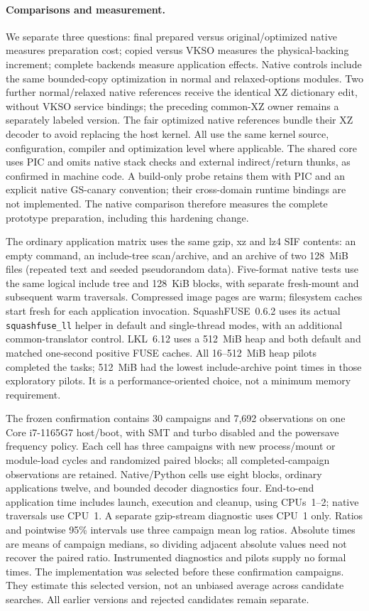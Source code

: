\paragraph{Comparisons and measurement.}
We separate three questions: final prepared versus original/optimized native
measures preparation cost; copied versus VKSO measures the physical-backing
increment; complete backends measure application effects. Native controls
include the same bounded-copy optimization in normal and relaxed-options
modules. Two further normal/relaxed native references receive the identical
XZ dictionary edit, without VKSO service bindings; the preceding common-XZ
owner remains a separately labeled version. The fair optimized native
references bundle their XZ decoder to avoid replacing the host kernel.
All use the same kernel
source, configuration, compiler and optimization level where applicable.
The shared core uses PIC and omits native stack checks and external
indirect/return thunks, as confirmed in machine code. A build-only probe
retains them with PIC and an explicit native GS-canary convention; their
cross-domain runtime bindings are not implemented. The native comparison
therefore measures the complete prototype preparation, including this
hardening change.

The ordinary application matrix uses the same gzip, xz and lz4 SIF contents:
an empty command, an include-tree scan/archive, and an archive of two
128~MiB files (repeated text and seeded pseudorandom data). Five-format native
tests use the same logical include tree and 128~KiB blocks, with separate
fresh-mount and subsequent warm traversals. Compressed image pages are warm;
filesystem caches start fresh for each application invocation.
SquashFUSE~0.6.2 uses its actual \texttt{squashfuse\_ll} helper in default and
single-thread modes, with an additional common-translator control.
LKL~6.12 uses a 512~MiB heap and both default and matched one-second positive
FUSE caches. All 16--512~MiB heap pilots completed the tasks; 512~MiB had the
lowest include-archive point times in those exploratory pilots. It is a
performance-oriented choice, not a minimum memory requirement.

The frozen confirmation contains 30 campaigns and 7,692 observations on one
Core i7-1165G7 host/boot, with SMT and turbo disabled and the powersave
frequency policy. Each cell has three campaigns with new process/mount or
module-load cycles and randomized paired blocks; all completed-campaign observations are retained.
Native/Python cells use eight blocks, ordinary applications twelve, and
bounded decoder diagnostics four. End-to-end application time includes
launch, execution and cleanup, using CPUs~1--2; native traversals use CPU~1.
A separate gzip-stream diagnostic uses CPU~1 only. Ratios and pointwise
95\% intervals use three campaign mean log ratios. Absolute times are means
of campaign medians, so dividing adjacent absolute values need not recover
the paired ratio. Instrumented diagnostics and pilots supply no formal times.
The implementation was selected before these confirmation campaigns. They
estimate this selected version, not an unbiased average across candidate
searches. All earlier versions and rejected candidates remain separate.

